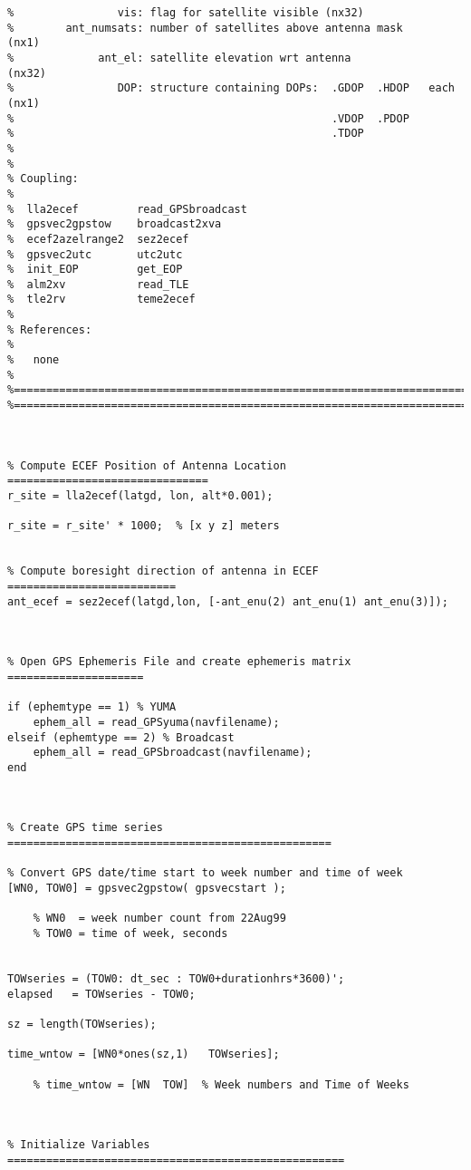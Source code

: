 \documentclass[12pt,a4paper,oneside]{article}
\begin{document}
\begin{appendix}
\begin{lstlisting}
%                vis: flag for satellite visible (nx32)
%        ant_numsats: number of satellites above antenna mask         (nx1)
%             ant_el: satellite elevation wrt antenna                (nx32)
%                DOP: structure containing DOPs:  .GDOP  .HDOP   each (nx1)  
%                                                 .VDOP  .PDOP
%                                                 .TDOP
%
%
% Coupling:
%
%  lla2ecef         read_GPSbroadcast
%  gpsvec2gpstow    broadcast2xva
%  ecef2azelrange2  sez2ecef
%  gpsvec2utc       utc2utc
%  init_EOP         get_EOP
%  alm2xv           read_TLE
%  tle2rv           teme2ecef
%  
% References:
% 
%   none
%
%==========================================================================
%==========================================================================



% Compute ECEF Position of Antenna Location ===============================
r_site = lla2ecef(latgd, lon, alt*0.001); 

r_site = r_site' * 1000;  % [x y z] meters


% Compute boresight direction of antenna in ECEF ==========================
ant_ecef = sez2ecef(latgd,lon, [-ant_enu(2) ant_enu(1) ant_enu(3)]);



% Open GPS Ephemeris File and create ephemeris matrix =====================

if (ephemtype == 1) % YUMA
    ephem_all = read_GPSyuma(navfilename);
elseif (ephemtype == 2) % Broadcast
    ephem_all = read_GPSbroadcast(navfilename);
end



% Create GPS time series ==================================================

% Convert GPS date/time start to week number and time of week
[WN0, TOW0] = gpsvec2gpstow( gpsvecstart );
  
    % WN0  = week number count from 22Aug99
    % TOW0 = time of week, seconds


TOWseries = (TOW0: dt_sec : TOW0+durationhrs*3600)';
elapsed   = TOWseries - TOW0;
    
sz = length(TOWseries);

time_wntow = [WN0*ones(sz,1)   TOWseries];    

    % time_wntow = [WN  TOW]  % Week numbers and Time of Weeks

    

% Initialize Variables ====================================================


\end{lstlisting}
\end{appendix}
\end{document}
